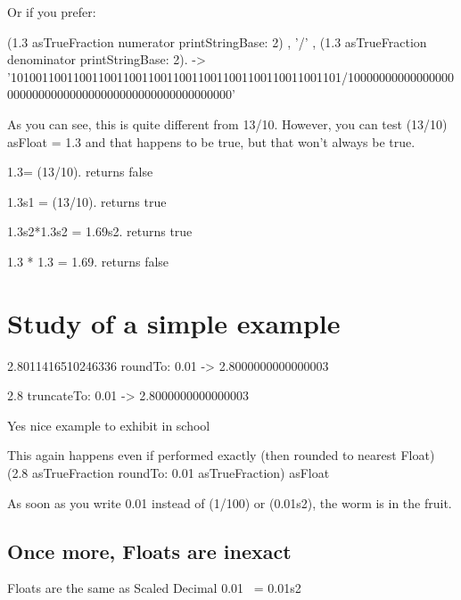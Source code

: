 \documentclass[a4paper,10pt,twoside]{book}
\begin{document}
Or if you prefer:

\begin{code}{}
(1.3 asTrueFraction numerator printStringBase: 2) , '/' , (1.3
asTrueFraction denominator printStringBase: 2).
-> '10100110011001100110011001100110011001100110011001101/10000000000000000000000000000000000000000000000000000'
\end{code}

As you can see, this is quite different from 13/10. However, you can test (13/10) asFloat = 1.3 and that happens to be
true, but that won't always be true.

\begin{code}{}
1.3= (13/10).
	returns false
	
1.3s1 = (13/10).
	returns true

1.3s2*1.3s2 = 1.69s2.
	returns true

1.3 * 1.3 = 1.69.
	returns false
\end{code}






\section{Study of a simple example}

\begin{code}{}
2.8011416510246336 roundTo: 0.01
-> 2.8000000000000003

2.8 truncateTo: 0.01
-> 2.8000000000000003
\end{code}






Yes nice example to exhibit in school

This again happens even if performed exactly (then rounded to nearest Float)
(2.8 asTrueFraction roundTo: 0.01 asTrueFraction) asFloat

As soon as you write 0.01 instead of (1/100) or (0.01s2), the worm is
in the fruit.



\subsection{Once more, Floats are inexact}

\begin{code}{Floats are the same as Scaled Decimal}
   0.01 ~= 0.01s2
\end{code}
   
\end{document}
